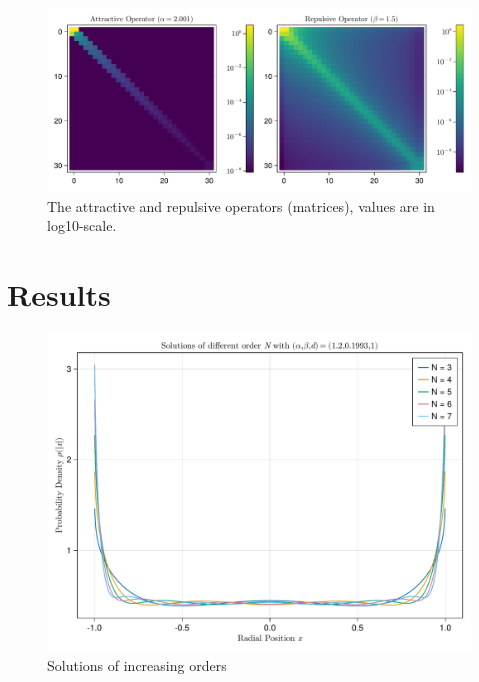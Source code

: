 \begin{figure}[H]
  \centering
  \label{fig:attractive-repulsive}
  \includegraphics[width=\linewidth]{../figures/results/attractive-repulsive-operators.pdf}
  \caption{The attractive and repulsive operators (matrices), values are in log10-scale.}
\end{figure}

\section{Results}
\begin{figure}[H]
  \centering
  \label{fig:solution-increasing-order}
  \includegraphics[width=0.8\linewidth]{../figures/results/solution-increasing-order.pdf}
  \caption{Solutions of increasing orders}
\end{figure}


